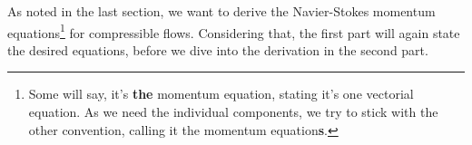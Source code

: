 As noted in the last section, we want to derive the Navier-Stokes momentum equations\footnote{Some will say, it's \textbf{the} momentum equation, stating it's one vectorial equation.
As we need the individual components, we try to stick with the other convention, calling it the momentum equation\textbf{s}.} for compressible flows.
Considering that, the first part will again state the desired equations, before we dive into the derivation in the second part.
